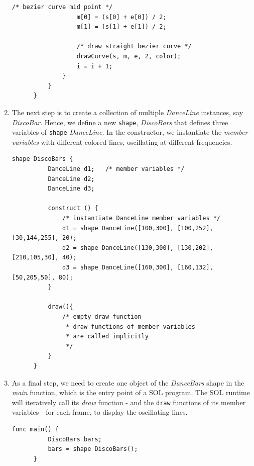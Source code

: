 \documentclass[letterpaper,12pt]{report}
\begin{document}
\begin{enumerate}
\begin{lstlisting}[style=sol, aboveskip=1pt]
                  /* bezier curve mid point */            
                  m[0] = (s[0] + e[0]) / 2;
                  m[1] = (s[1] + e[1]) / 2;

                  /* draw straight bezier curve */
                  drawCurve(s, m, e, 2, color);
                  i = i + 1;
              }
          }
      }
    \end{lstlisting}

    \item The next step is to create a collection of multiple \textit{DanceLine} instances, say \textit{DiscoBar}. Hence, we define a new \texttt{shape}, \textit{DiscoBars} that defines three variables of \texttt{shape} \textit{DanceLine}. In the constructor, we instantiate the \textit{member variables} with different colored lines, oscillating at different frequencies.\\

    \begin{lstlisting}[style=sol, aboveskip=1pt]
      shape DiscoBars {
          DanceLine d1;   /* member variables */
          DanceLine d2;
          DanceLine d3;

          construct () {
              /* instantiate DanceLine member variables */
              d1 = shape DanceLine([100,300], [100,252], [30,144,255], 20);
              d2 = shape DanceLine([130,300], [130,202], [210,105,30], 40);
              d3 = shape DanceLine([160,300], [160,132], [50,205,50], 80);
          }

          draw(){
              /* empty draw function 
               * draw functions of member variables
               * are called implicitly
               */
          }
      }
    \end{lstlisting}
  
    \item As a final step, we need to create one object of the \textit{DanceBars} shape in the \textit{main} function, which is the entry point of a SOL program. The SOL runtime will iteratively call its \textit{draw} function - and the \texttt{draw} functions of its member variables - for each frame, to display the oscillating lines.\\

    \begin{lstlisting}[style=sol, aboveskip=1pt]
      func main() {
          DiscoBars bars;
          bars = shape DiscoBars();
      }
    \end{lstlisting}
  \end{enumerate}
\end{document}
